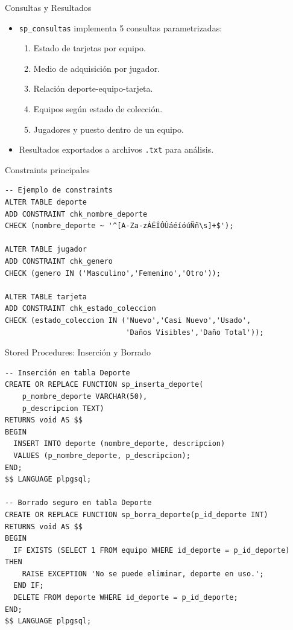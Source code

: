 \documentclass{beamer}
\begin{document}
\begin{frame}{Consultas y Resultados}
  \begin{itemize}
    \item \texttt{sp\_consultas} implementa 5 consultas parametrizadas:
    \begin{enumerate}
      \item Estado de tarjetas por equipo.
      \item Medio de adquisición por jugador.
      \item Relación deporte-equipo-tarjeta.
      \item Equipos según estado de colección.
      \item Jugadores y puesto dentro de un equipo.
    \end{enumerate}
    \item Resultados exportados a archivos \texttt{.txt} para análisis.
  \end{itemize}
\end{frame}

\begin{frame}[fragile]{Constraints principales}
\begin{lstlisting}
-- Ejemplo de constraints
ALTER TABLE deporte 
ADD CONSTRAINT chk_nombre_deporte 
CHECK (nombre_deporte ~ '^[A-Za-zÁÉÍÓÚáéíóúÑñ\s]+$');

ALTER TABLE jugador 
ADD CONSTRAINT chk_genero 
CHECK (genero IN ('Masculino','Femenino','Otro'));

ALTER TABLE tarjeta 
ADD CONSTRAINT chk_estado_coleccion 
CHECK (estado_coleccion IN ('Nuevo','Casi Nuevo','Usado',
                            'Daños Visibles','Daño Total'));
\end{lstlisting}
\end{frame}

\begin{frame}[fragile]{Stored Procedures: Inserción y Borrado}
\begin{lstlisting}
-- Inserción en tabla Deporte
CREATE OR REPLACE FUNCTION sp_inserta_deporte(
    p_nombre_deporte VARCHAR(50),
    p_descripcion TEXT)
RETURNS void AS $$
BEGIN
  INSERT INTO deporte (nombre_deporte, descripcion)
  VALUES (p_nombre_deporte, p_descripcion);
END;
$$ LANGUAGE plpgsql;

-- Borrado seguro en tabla Deporte
CREATE OR REPLACE FUNCTION sp_borra_deporte(p_id_deporte INT)
RETURNS void AS $$
BEGIN
  IF EXISTS (SELECT 1 FROM equipo WHERE id_deporte = p_id_deporte) THEN
    RAISE EXCEPTION 'No se puede eliminar, deporte en uso.';
  END IF;
  DELETE FROM deporte WHERE id_deporte = p_id_deporte;
END;
$$ LANGUAGE plpgsql;
\end{lstlisting}
\end{frame}
\end{document}
